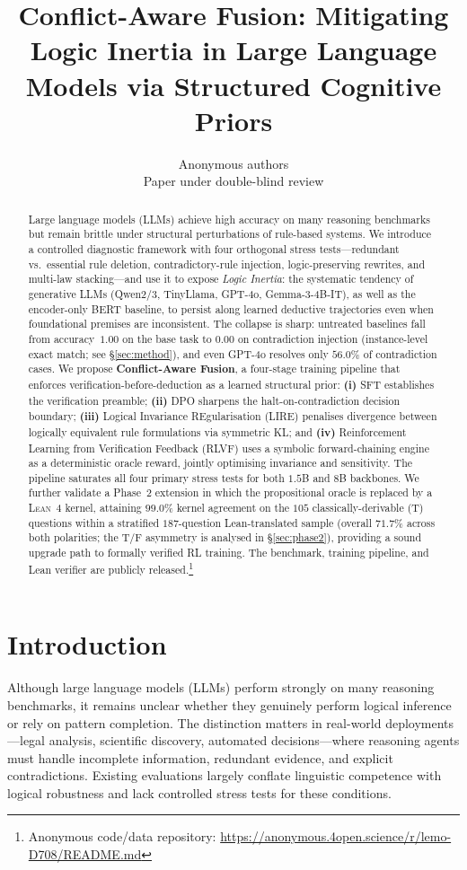 \documentclass{article}
\title{Conflict-Aware Fusion: Mitigating Logic Inertia in Large Language Models via Structured Cognitive Priors}
\author{Anonymous authors \\ Paper under double-blind review}
\begin{document}
\maketitle

\begin{abstract}
Large language models (LLMs) achieve high accuracy on many reasoning benchmarks but remain brittle under structural perturbations of rule-based systems. We introduce a controlled diagnostic framework with four orthogonal stress tests---redundant vs.\ essential rule deletion, contradictory-rule injection, logic-preserving rewrites, and multi-law stacking---and use it to expose \emph{Logic Inertia}: the systematic tendency of generative LLMs (Qwen2/3, TinyLlama, GPT-4o, Gemma-3-4B-IT), as well as the encoder-only BERT baseline, to persist along learned deductive trajectories even when foundational premises are inconsistent. The collapse is sharp: untreated baselines fall from accuracy~$1.00$ on the base task to $0.00$ on contradiction injection (instance-level exact match; see \S\ref{sec:method}), and even GPT-4o resolves only $56.0\%$ of contradiction cases. We propose \textbf{Conflict-Aware Fusion}, a four-stage training pipeline that enforces verification-before-deduction as a learned structural prior: \textbf{(i)} SFT establishes the verification preamble; \textbf{(ii)} DPO sharpens the halt-on-contradiction decision boundary; \textbf{(iii)} Logical Invariance REgularisation (LIRE) penalises divergence between logically equivalent rule formulations via symmetric KL; and \textbf{(iv)} Reinforcement Learning from Verification Feedback (RLVF) uses a symbolic forward-chaining engine as a deterministic oracle reward, jointly optimising invariance and sensitivity. The pipeline saturates all four primary stress tests for both $1.5$B and $8$B backbones. We further validate a Phase~2 extension in which the propositional oracle is replaced by a \textsc{Lean~4} kernel, attaining $99.0\%$ kernel agreement on the $105$ classically-derivable (T) questions within a stratified $187$-question Lean-translated sample (overall $71.7\%$ across both polarities; the T/F asymmetry is analysed in \S\ref{sec:phase2}), providing a sound upgrade path to formally verified RL training. The benchmark, training pipeline, and Lean verifier are publicly released.\footnote{Anonymous code/data repository: \url{https://anonymous.4open.science/r/lemo-D708/README.md}}
\end{abstract}

\section{Introduction}
\label{sec:introduction}
Although large language models (LLMs) perform strongly on many reasoning benchmarks, it remains unclear whether they genuinely perform logical inference or rely on pattern completion. The distinction matters in real-world deployments---legal analysis, scientific discovery, automated decisions---where reasoning agents must handle incomplete information, redundant evidence, and explicit contradictions. Existing evaluations largely conflate linguistic competence with logical robustness and lack controlled stress tests for these conditions.
\end{document}
